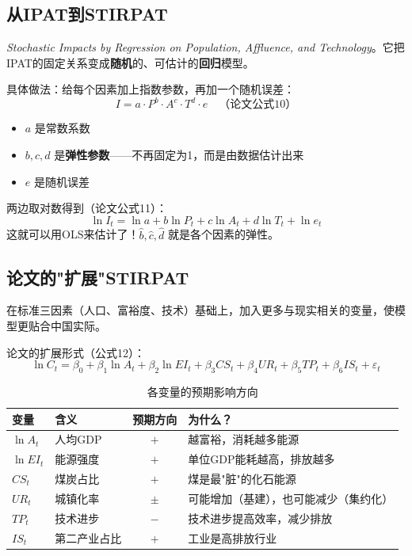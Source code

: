 \documentclass[12pt, a4paper]{article}
\begin{document}
\subsection{从IPAT到STIRPAT}

\begin{conceptbox}[STIRPAT]
\textit{Stochastic Impacts by Regression on Population, Affluence, and Technology}。它把IPAT的固定关系变成\textbf{随机}的、可估计的\textbf{回归}模型。
\end{conceptbox}

具体做法：给每个因素加上指数参数，再加一个随机误差：
\[
I = a \cdot P^b \cdot A^c \cdot T^d \cdot e \quad \text{（论文公式10）}
\]
\begin{itemize}[leftmargin=2em]
\item $a$ 是常数系数
\item $b, c, d$ 是\textbf{弹性参数}——不再固定为1，而是由数据估计出来
\item $e$ 是随机误差
\end{itemize}

两边取对数得到（论文公式11）：
\[
\ln I_t = \ln a + b \ln P_t + c \ln A_t + d \ln T_t + \ln e_t
\]
这就可以用OLS来估计了！$\hat{b}, \hat{c}, \hat{d}$ 就是各个因素的弹性。

\subsection{论文的"扩展"STIRPAT}

\begin{conceptbox}[扩展STIRPAT]
在标准三因素（人口、富裕度、技术）基础上，加入更多与现实相关的变量，使模型更贴合中国实际。
\end{conceptbox}

论文的扩展形式（公式12）：
\[
\ln C_t = \beta_0 + \beta_1 \ln A_t + \beta_2 \ln EI_t + \beta_3 CS_t + \beta_4 UR_t + \beta_5 TP_t + \beta_6 IS_t + \varepsilon_t
\]

\begin{table}[H]
\centering
\small
\begin{tabularx}{\textwidth}{llcl}
\toprule
\textbf{变量} & \textbf{含义} & \textbf{预期方向} & \textbf{为什么？} \\
\midrule
 $\ln A_t$ & 人均GDP & $+$ & 越富裕，消耗越多能源 \\
 $\ln EI_t$ & 能源强度 & $+$ & 单位GDP能耗越高，排放越多 \\
 $CS_t$ & 煤炭占比 & $+$ & 煤是最"脏"的化石能源 \\
 $UR_t$ & 城镇化率 & $\pm$ & 可能增加（基建），也可能减少（集约化） \\
 $TP_t$ & 技术进步 & $-$ & 技术进步提高效率，减少排放 \\
 $IS_t$ & 第二产业占比 & $+$ & 工业是高排放行业 \\
\bottomrule
\end{tabularx}
\caption{各变量的预期影响方向}
\end{table}
\end{document}
